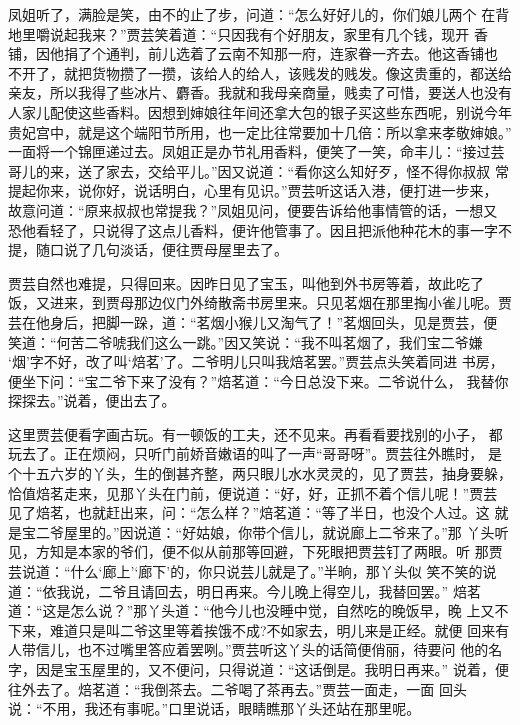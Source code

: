 凤姐听了，满脸是笑，由不的止了步，问道：“怎么好好儿的，你们娘儿两个
在背地里嚼说起我来？”贾芸笑着道：“只因我有个好朋友，家里有几个钱，现开
香铺，因他捐了个通判，前儿选着了云南不知那一府，连家眷一齐去。他这香铺也
不开了，就把货物攒了一攒，该给人的给人，该贱发的贱发。像这贵重的，都送给
亲友，所以我得了些冰片、麝香。我就和我母亲商量，贱卖了可惜，要送人也没有
人家儿配使这些香料。因想到婶娘往年间还拿大包的银子买这些东西呢，别说今年
贵妃宫中，就是这个端阳节所用，也一定比往常要加十几倍：所以拿来孝敬婶娘。”
一面将一个锦匣递过去。凤姐正是办节礼用香料，便笑了一笑，命丰儿：“接过芸
哥儿的来，送了家去，交给平儿。”因又说道：“看你这么知好歹，怪不得你叔叔
常提起你来，说你好，说话明白，心里有见识。”贾芸听这话入港，便打进一步来，
故意问道：“原来叔叔也常提我？”凤姐见问，便要告诉给他事情管的话，一想又
恐他看轻了，只说得了这点儿香料，便许他管事了。因且把派他种花木的事一字不
提，随口说了几句淡话，便往贾母屋里去了。

贾芸自然也难提，只得回来。因昨日见了宝玉，叫他到外书房等着，故此吃了
饭，又进来，到贾母那边仪门外绮散斋书房里来。只见茗烟在那里掏小雀儿呢。贾
芸在他身后，把脚一跺，道：“茗烟小猴儿又淘气了！”茗烟回头，见是贾芸，便
笑道：“何苦二爷唬我们这么一跳。”因又笑说：“我不叫茗烟了，我们宝二爷嫌
‘烟’字不好，改了叫‘焙茗’了。二爷明儿只叫我焙茗罢。”贾芸点头笑着同进
书房，便坐下问：“宝二爷下来了没有？”焙茗道：“今日总没下来。二爷说什么，
我替你探探去。”说着，便出去了。

这里贾芸便看字画古玩。有一顿饭的工夫，还不见来。再看看要找别的小子，
都玩去了。正在烦闷，只听门前娇音嫩语的叫了一声“哥哥呀”。贾芸往外瞧时，
是个十五六岁的丫头，生的倒甚齐整，两只眼儿水水灵灵的，见了贾芸，抽身要躲，
恰值焙茗走来，见那丫头在门前，便说道：“好，好，正抓不着个信儿呢！”贾芸
见了焙茗，也就赶出来，问：“怎么样？”焙茗道：“等了半日，也没个人过。这
就是宝二爷屋里的。”因说道：“好姑娘，你带个信儿，就说廊上二爷来了。”那
丫头听见，方知是本家的爷们，便不似从前那等回避，下死眼把贾芸钉了两眼。听
那贾芸说道：“什么‘廊上’‘廊下’的，你只说芸儿就是了。”半晌，那丫头似
笑不笑的说道：“依我说，二爷且请回去，明日再来。今儿晚上得空儿，我替回罢。”
焙茗道：“这是怎么说？”那丫头道：“他今儿也没睡中觉，自然吃的晚饭早，晚
上又不下来，难道只是叫二爷这里等着挨饿不成?不如家去，明儿来是正经。就便
回来有人带信儿，也不过嘴里答应着罢咧。”贾芸听这丫头的话简便俏丽，待要问
他的名字，因是宝玉屋里的，又不便问，只得说道：“这话倒是。我明日再来。”
说着，便往外去了。焙茗道：“我倒茶去。二爷喝了茶再去。”贾芸一面走，一面
回头说：“不用，我还有事呢。”口里说话，眼睛瞧那丫头还站在那里呢。

